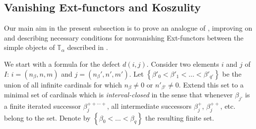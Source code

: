 \documentclass[11pt]{article}
\theoremstyle{plain}
\theoremstyle{nonumberplain}
\theoremstyle{plain}
\theoremstyle{nonumberplain}
\newcommand\bT{\mathbb T}
\begin{document}
\subsection{Vanishing Ext-functors and Koszulity}\label{se.exts}


Our main aim in the present subsection is to prove an analogue of
\cite[Theorem 3.11]{us}, improving on  and describing necessary
conditions for nonvanishing Ext-functors between the simple
objects of $\bT_\alpha$ described in .


We start with a formula for the defect $d(i,j)$.  Consider two
elements $i$ and $j$ of $I$: $i=\left(n_\beta,n,m\right)$ and
$j=\left(n_\beta',n',m'\right)$.  Let
$\left\{\beta'_0<\beta'_1<\ldots<\beta'_{q'}\right\}$ be the union of
all infinite cardinals for which $n_\beta\neq 0$ or
$n'_{\beta'}\neq 0$.  Extend this set to a minimal set of cardinals
which is \emph{interval-closed} in the sense that whenever
$\beta_{j'}$ is a finite iterated successor $\beta_j^{++\cdots +}$,
all intermediate successors $\beta_j^+$, $\beta_j^{++}$, etc. belong
to the set.  Denote by $\left\{\beta_0<\ldots<\beta_q\right\}$ the
resulting finite set.

\end{document}
